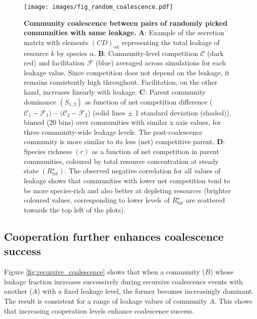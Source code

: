 \documentclass[10pt,letterpaper]{article}
\begin{document}
\begin{figure}[t]
\begin{adjustwidth}{-1.5in}{0in}
    \centering \texttt{[image: images/fig\_random\_coalescence.pdf]}
    \vspace{1pt}
    \caption{\textbf{Community coalescence between pairs of randomly picked communities with same leakage.} {\bf A}: Example of the secretion matrix with elements $(C D)_{\alpha k}$ representing the total leakage of resource $k$ by species $\alpha$. {\bf B}: Community-level competition $\mathcal{C}$ (dark red) and facilitation $\mathcal{F}$ (blue) averaged across simulations for each leakage value. Since competition does not depend on the leakage, it remains consistently high throughout. Facilitation, on the other hand, increases linearly with leakage. {\bf C}: Parent community dominance $(S_{1, 2})$ as function of net competition difference ($\mathcal{C}_1 - \mathcal{F}_1) - (\mathcal{C}_2 - \mathcal{F}_2$) (solid lines $\pm$ 1 standard deviation (shaded)), binned (20 bins) over communities with similar x axis values, for three community-wide leakage levels. The post-coalescence community is more similar to its less (net) competitive parent. {\bf D}: Species richness $(r)$ as a function of net competition in parent communities, coloured by total resource concentration at steady state $(R_{tot}^{\star})$. The observed negative correlation for all values of leakage shows that communities with lower net competition tend to be more species-rich and also better at depleting resources (brighter coloured values, corresponding to lower levels of $R_{tot}^{\star}$ are scattered towards the top left of the plots).}
    \label{fig:random_coalescence}
\end{adjustwidth}
\end{figure}

\subsection*{Cooperation further enhances coalescence success}

Figure \ref{fig:recursive_coalescence} shows that when a community ($B$) whose leakage fraction increases successively during recursive coalescence events with another ($A$) with a fixed leakage level, the former becomes increasingly dominant. The result is consistent for a range of leakage values of community $A$. This shows that increasing cooperation levels enhance coalescence success.
\end{document}
